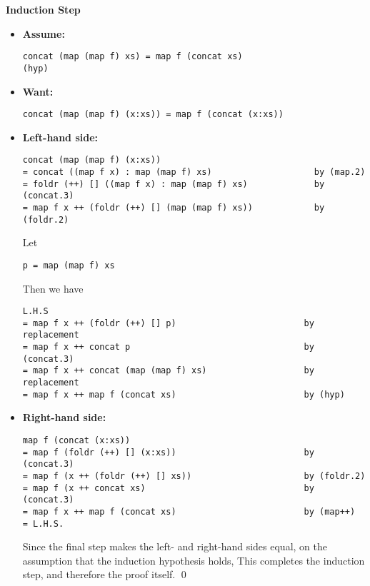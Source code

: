 \documentclass[11pt]{article}
\theoremstyle{definition}
\begin{document}
\begin{enumerate}
\textbf{Induction Step}
\begin{itemize}
\item \textbf{Assume:}
\begin{verbatim}
concat (map (map f) xs) = map f (concat xs)                         (hyp)
\end{verbatim}
\item \textbf{Want:}
\begin{verbatim}
concat (map (map f) (x:xs)) = map f (concat (x:xs))
\end{verbatim}
\item \textbf{Left-hand side:}
\begin{verbatim}
concat (map (map f) (x:xs))
= concat ((map f x) : map (map f) xs)                    by (map.2)
= foldr (++) [] ((map f x) : map (map f) xs)             by (concat.3)
= map f x ++ (foldr (++) [] (map (map f) xs))            by (foldr.2)
\end{verbatim}
Let
\begin{verbatim}
p = map (map f) xs
\end{verbatim}
Then we have
\begin{verbatim}
L.H.S
= map f x ++ (foldr (++) [] p)                         by replacement
= map f x ++ concat p                                  by (concat.3)
= map f x ++ concat (map (map f) xs)                   by replacement
= map f x ++ map f (concat xs)                         by (hyp)
\end{verbatim}
\item \textbf{Right-hand side:}
\begin{verbatim}
map f (concat (x:xs))
= map f (foldr (++) [] (x:xs))                         by (concat.3)
= map f (x ++ (foldr (++) [] xs))                      by (foldr.2)
= map f (x ++ concat xs)                               by (concat.3)
= map f x ++ map f (concat xs)                         by (map++)
= L.H.S.
\end{verbatim}
Since the final step makes the left- and right-hand sides equal, on the assumption that the induction hypothesis holds, This completes the induction step, and therefore the proof itself. \qed
\end{itemize}

\end{enumerate}
\end{document}
